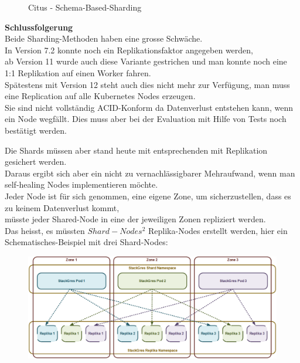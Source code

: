 \begin{flushleft}
\begin{flushleft}
\begin{flushleft}
\begin{figure}[H]
                \caption{Citus - Schema-Based-Sharding}
                \label{fig:citus_schema-based-sharding}
            \end{figure}
        \end{flushleft}
        \begin{flushleft}
            \textbf{Schlussfolgerung}\\
            Beide Sharding-Methoden haben eine grosse Schwäche.\\
            In Version 7.2 konnte noch ein Replikationsfaktor angegeben werden\cite{8W58EW47},\\
            ab Version 11 wurde auch diese Variante gestrichen und man konnte noch eine 1:1 Replikation auf einen Worker fahren\cite{JWYDYYWQ}.\\
            Spätestens mit Version 12 steht auch dies nicht mehr zur Verfügung, man muss eine Replication auf alle \Gls{Kubernetes} Nodes erzeugen.\\
            Sie sind nicht vollständig ACID-Konform da Datenverlust entstehen kann, wenn ein Node wegfällt.
            Dies muss aber bei der Evaluation mit Hilfe von Tests noch bestätigt werden.
        \end{flushleft}
        \begin{flushleft}
            Die Shards müssen aber stand heute mit entsprechenden mit Replikation gesichert werden\cite{4GDXA49I}.\\
            Daraus ergibt sich aber ein nicht zu vernachlässigbarer Mehraufwand, wenn man self-healing Nodes implementieren möchte.\\
            Jeder Node ist für sich genommen, eine eigene Zone, um sicherzustellen, dass es zu keinem Datenverlust kommt,\\
            müsste jeder Shared-Node in eine der jeweiligen Zonen repliziert werden.\\
            Das heisst, es müssten \(Shard-Nodes^2 \) Replika-Nodes erstellt werden, hier ein Schematisches-Beispiel mit drei Shard-Nodes:
            \begin{figure}[H]
                \centering
                \includegraphics[width=0.8\linewidth]{source/implementation/evaluation/postgresql_ha_solutions/stackgres/stackgres_shard_replication}

\end{figure}
\end{flushleft}
\end{flushleft}
\end{flushleft}
